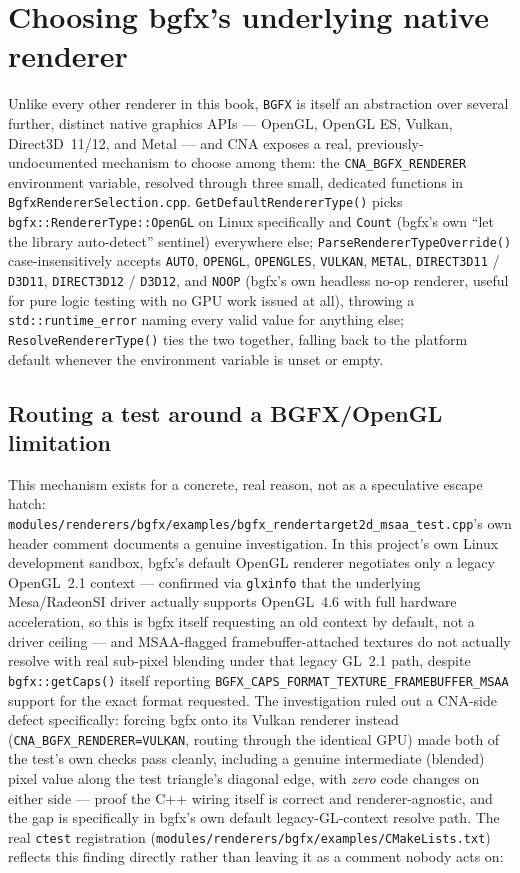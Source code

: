 \section{Choosing bgfx's underlying native renderer}
\label{sec:bgfx-renderer-selection}

Unlike every other renderer in this book, \texttt{BGFX} is itself an abstraction over several
further, distinct native graphics APIs --- OpenGL, OpenGL ES, Vulkan, Direct3D~11/12, and
Metal --- and CNA exposes a real, previously-undocumented mechanism to choose among them: the
\texttt{CNA\_BGFX\_RENDERER} environment variable, resolved through three small, dedicated
functions in \texttt{BgfxRendererSelection.cpp}. \texttt{GetDefaultRendererType()} picks
\texttt{bgfx::RendererType::OpenGL} on Linux specifically and \texttt{Count} (bgfx's own
``let the library auto-detect'' sentinel) everywhere else; \texttt{ParseRendererTypeOverride()}
case-insensitively accepts \texttt{AUTO}, \texttt{OPENGL}, \texttt{OPENGLES}, \texttt{VULKAN},
\texttt{METAL}, \texttt{DIRECT3D11} / \texttt{D3D11}, \texttt{DIRECT3D12} / \texttt{D3D12}, and
\texttt{NOOP} (bgfx's own headless no-op renderer, useful for pure logic testing with no GPU
work issued at all), throwing a \texttt{std::runtime\_error} naming every valid value for
anything else; \texttt{ResolveRendererType()} ties the two together, falling back to the
platform default whenever the environment variable is unset or empty.

\subsection{Routing a test around a BGFX/OpenGL limitation}

This mechanism exists for a concrete, real reason, not as a speculative escape hatch:
\texttt{modules/renderers/bgfx/examples/\allowbreak{}bgfx\_rendertarget2d\_msaa\_test.cpp}'s own header comment documents a genuine
investigation. In this project's own Linux development sandbox, bgfx's default OpenGL renderer
negotiates only a legacy OpenGL~2.1 context --- confirmed via \texttt{glxinfo} that the
underlying Mesa/RadeonSI driver actually supports OpenGL~4.6 with full hardware acceleration,
so this is bgfx itself requesting an old context by default, not a driver ceiling --- and
MSAA-flagged framebuffer-attached textures do not actually resolve with real sub-pixel blending
under that legacy GL~2.1 path, despite \texttt{bgfx::getCaps()} itself reporting
\texttt{BGFX\_CAPS\_FORMAT\_TEXTURE\_FRAMEBUFFER\_MSAA} support for the exact format requested.
The investigation ruled out a CNA-side defect specifically: forcing bgfx onto its Vulkan
renderer instead (\texttt{CNA\_BGFX\_RENDERER=VULKAN}, routing through the identical GPU) made
both of the test's own checks pass cleanly, including a genuine intermediate (blended) pixel
value along the test triangle's diagonal edge, with \emph{zero} code changes on either side ---
proof the C++ wiring itself is correct and renderer-agnostic, and the gap is specifically in
bgfx's own default legacy-GL-context resolve path. The real \texttt{ctest} registration
(\texttt{modules/renderers/bgfx/examples/CMakeLists.txt}) reflects this finding directly rather than leaving it as
a comment nobody acts on:


